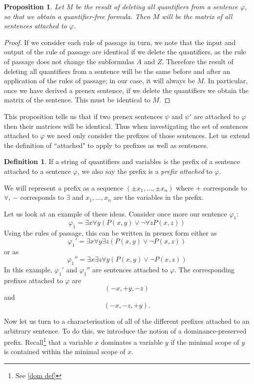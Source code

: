 \documentclass[a4paper,12pt]{report}
\newtheorem{prop}[lem]{Proposition}
\theoremstyle{definition}
\newtheorem{mydef}[lem]{Definition}
\begin{document}
\begin{prop}
Let $M$ be the result of deleting all quantifiers from a sentence $\varphi$, so that we obtain a quantifier-free formula. Then $M$ will be the matrix of all sentences attached to $\varphi$.
\end{prop}
\begin{proof}
If we consider each rule of passage in turn, we note that the input and output of the rule of passage are identical if we delete the quantifiers, as the rule of passage does not change the subformulas $A$ and $Z$. Therefore the result of deleting all quantifiers from a sentence will be the same before and after an application of the rules of passage; in our case, it will always be $M$. In particular, once we have derived a prenex sentence, if we delete the quantifiers we obtain the matrix of the sentence. This must be identical to $M$.
\end{proof}

This proposition tells us that if two prenex sentences $\psi$ and $\psi '$ are attached to $\varphi$ then their matrices will be identical. Thus when investigating the set of sentences attached to $\varphi$ we need only consider the prefixes of those sentences. Let us extend the definition of ``attached" to apply to prefixes as well as sentences.

\begin{mydef}
If a string of quantifiers and variables is the prefix of a sentence attached to a sentence $\varphi$,   we also say the prefix is a \emph{prefix attached} to $\varphi$.
\end{mydef}

We will represent a prefix as a sequence $ ( \pm x_1, \ldots , \pm x_n ) $ where $+$ corresponds to $\forall$, $ -$ corresponds to $\exists$ and $x_1, \ldots , x_n$ are the variables in the prefix.

Let us look at an example of these ideas. Consider once more our sentence $\varphi_1$:
$$
\varphi_1 = \exists x \forall y (P(x,y) \lor \neg \forall z P(x,z))
$$
Using the rules of passage, this can be written in prenex form either as
$$
\varphi_1 ' = \exists x \forall y \exists z (P(x,y) \lor \neg P(x,z))
$$
or as
$$
\varphi_1 '' = \exists x \exists z \forall y (P(x,y) \lor \neg P(x,z))
$$
In this example, $\varphi_1 '$ and $\varphi_1 ''$ are sentences attached to $\varphi$. The corresponding prefixes attached to $\varphi$ are
$$
( -x, +y , -z)
$$
and
$$
( -x, -z, +y).
$$

Now let us turn to a characterisation of all of the different prefixes attached to an arbitrary sentence. To do this, we introduce the notion of a dominance-preserved prefix. Recall\footnote{See \ref{dom def}} that a variable $x$ dominates a variable $y$ if the minimal scope of $y$ is contained within the minimal scope of $x$.
\end{document}
